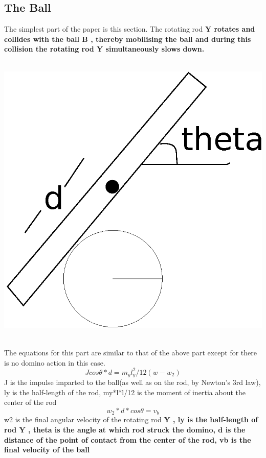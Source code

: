 \documentclass[11pt]{article}
\begin{document}
\subsection{The Ball}
The simplest part of the paper is this section. The rotating rod \bf Y \rm rotates and collides with the ball \bf B \rm, thereby mobilising the ball and during this collision the rotating rod \bf Y \rm simultaneously slows down.\\
\\
\centerline{\includegraphics[scale=0.2]{3}}\\
The equations for this part are similar to that of the above part except for there is no domino action in this case.\\
\begin{equation}Jcos\theta*d=m_yl_y^2/12(w - w_2) \end{equation}
J is the impulse imparted to the ball(as well as on the rod, by Newton's 3rd law), ly is the half-length of the rod, my*l*l/12 is the moment of inertia about the center of the rod
\begin{equation}w_2*d*cos\theta=v_b\end{equation}
w2 is the final angular velocity of the rotating rod \bf Y \rm, ly is the half-length of rod \bf Y \rm, theta is the angle at which rod struck the domino, d is the distance of the point of contact from the center of the rod, vb is the final velocity of the ball
\end{document}
